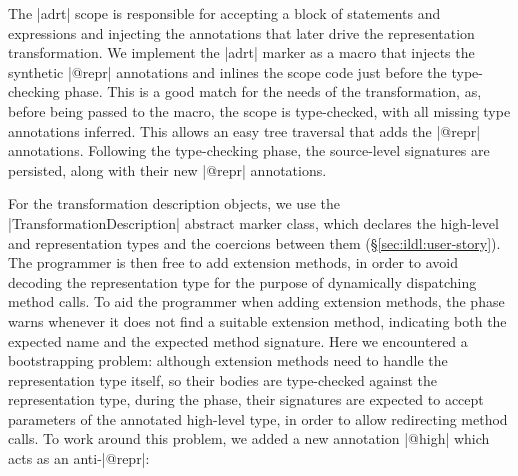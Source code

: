 The |adrt| scope is responsible for accepting a block of statements
and expressions and injecting the annotations that later drive the
representation transformation. 
%
We implement the |adrt| marker as a macro that injects the synthetic
|@repr| annotations and inlines the scope code just before the
type-checking phase. This is a good match for the needs of the
transformation, as, before being passed to the macro, the scope is
type-checked, with all missing type annotations inferred. This allows
an easy tree traversal that adds the |@repr| annotations. Following
the type-checking phase, the source-level signatures are persisted,
along with their new |@repr| annotations.

For the transformation description objects, we use the
|TransformationDescription| abstract marker class, which declares the
high-level and representation types and the coercions between them
(\S\ref{sec:ildl:user-story}). The programmer is then free to add
extension methods, in order to avoid decoding the representation type
for the purpose of dynamically dispatching method calls. To aid the
programmer when adding extension methods, the \coerce{} phase warns
whenever it does not find a suitable extension method, indicating both
the expected name and the expected method signature. Here we
encountered a bootstrapping problem: although extension methods need
to handle the representation type itself, so their bodies are
type-checked against the representation type, during the \coerce{}
phase, their signatures are expected to accept parameters of the
annotated high-level type, in order to allow redirecting method
calls. To work around this problem, we added a new annotation |@high|
which acts as an anti-|@repr|:

